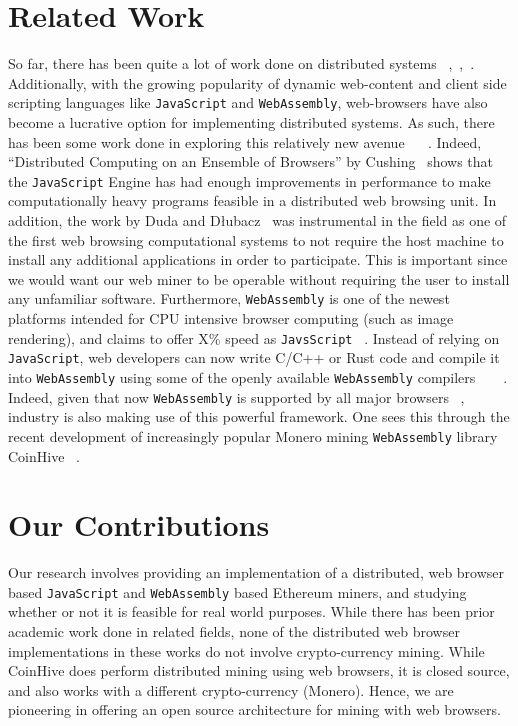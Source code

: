 \documentclass[runningheads]{llncs}
\begin{document}
\section{Related Work}
So far, there has been quite a lot of work done on distributed systems ~\cite{scheduling},~\cite{parallel},~\cite{orca}. Additionally, with the growing popularity of dynamic web-content and client side scripting languages like \verb|JavaScript| and \verb|WebAssembly|, web-browsers have also become a lucrative option for implementing distributed systems. As such, there has been some work done in exploring this relatively new avenue ~\cite{WebFlow} ~\cite{Duda}. 
Indeed, ``Distributed Computing on an Ensemble of Browsers'' by Cushing~\cite{Cushing} shows that the \verb|JavaScript| Engine has had enough improvements in performance to make computationally heavy programs feasible in a distributed web browsing unit. In addition, the work by Duda and Dłubacz~\cite{Duda} was instrumental in the field as one of the first web browsing computational systems to not require the host machine to install any additional applications in order to participate. This is important since we would want our web miner to be operable without requiring the user to install any unfamiliar software. Furthermore, \verb|WebAssembly| is one of the newest platforms intended for CPU intensive browser computing (such as image rendering), and claims to offer X\% speed as \verb|JavsScript| ~\cite{WebAssembly}. Instead of relying on \verb|JavaScript|, web developers can now write C/C++ or Rust code and compile it into \verb|WebAssembly| using some of the openly available \verb|WebAssembly| compilers ~\cite{emscripten} ~\cite{rustCompiler} . Indeed, given that now \verb|WebAssembly| is supported by all major browsers ~\cite{webasmSupport}, industry is also making use of this powerful framework. One sees this through the recent development of increasingly popular Monero mining \verb|WebAssembly| library CoinHive ~\cite{coinhive}.

\section{Our Contributions}
Our research involves providing an implementation of a distributed, web browser based \verb|JavaScript| and \verb|WebAssembly| based Ethereum miners, and studying whether or not it is feasible for real world purposes. While there has been prior academic work done in related fields, none of the distributed web browser implementations in these works do not involve crypto-currency mining. While CoinHive does perform distributed mining using web browsers, it is closed source, and also works with a different crypto-currency (Monero). Hence, we are pioneering in offering an open source architecture for mining with web browsers.
\end{document}
